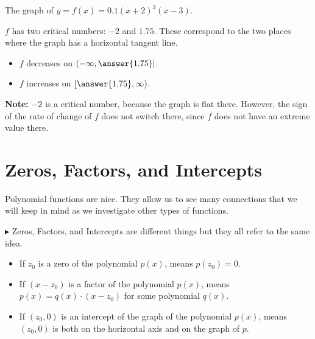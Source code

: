 \documentclass{ximera}
\begin{document}
\begin{example}

The graph of $y = f(x) = 0.1(x+2)^3(x-3)$.



\begin{center}
\end{center}



$f$ has two critical numbers: $-2$ and $1.75$. These correspond to the two places where the graph has a horizontal tangent line.

\begin{itemize}
\item $f$ decreases on $\left(-\infty, \answer{1.75}\right]$.
\item $f$ increases on $\left[\answer{1.75}, \infty\right)$.
\end{itemize}




\end{example}


\textbf{Note:} $-2$ is a critical number, because the graph is flat there.  However, the sign of the rate of change of $f$ does not switch there, since $f$ does not have an extreme value there.










\section{Zeros, Factors, and Intercepts}




Polynomial functions are nice.  They allow us to see many connections that we will keep in mind as we investigate other types of functions.


\textbf{\textcolor{red!90!darkgray}{$\blacktriangleright$}} Zeros, Factors, and Intercepts are different things but they all refer to the same idea.





\begin{itemize}

\item If $z_0$ is a zero of the polynomial $p(x)$, means $p(z_0)=0$.


\item If $(x-z_0)$ is a factor of the polynomial $p(x)$, means $p(x) = q(x) \cdot (x-z_0)$ for some polynomial $q(x)$.


\item If $(z_0,0)$ is an intercept of the graph of the polynomial $p(x)$, means $(z_0,0)$ is both on the horizontal axis and on the graph of $p$.

\end{itemize}
\end{document}
